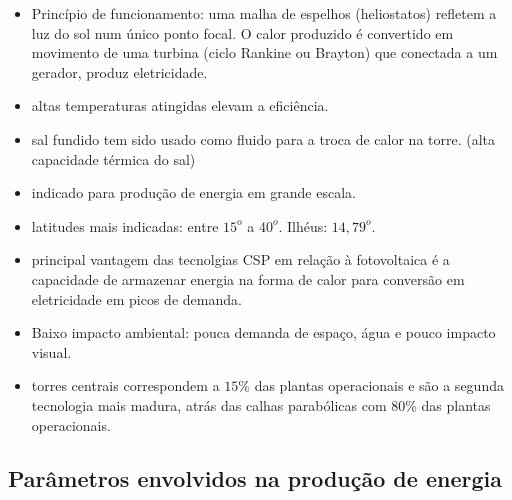 \documentclass[12pt,notheorems,hyperref={pdfauthor= Rafael Nardi}]{beamer}
\begin{document}
\begin{frame}%
	\begin{itemize}
		\item Princípio de funcionamento: uma malha de espelhos (heliostatos)
			refletem a luz do sol num único ponto focal. O calor produzido é
			convertido em movimento de uma turbina (ciclo Rankine ou Brayton) que
			conectada a um gerador, produz eletricidade.\pause
		\item altas temperaturas atingidas elevam a eficiência.\pause
		\item sal fundido tem sido usado como fluido para a troca de calor na
			torre. (alta capacidade térmica do sal) \pause
		\item indicado para produção de energia em grande escala.\pause
		\item latitudes mais indicadas: entre $15^o$ a $40^o$. Ilhéus: $14,79^o$.\pause
		\item principal vantagem das tecnolgias CSP em relação à fotovoltaica é a
			capacidade de armazenar energia na forma de calor para conversão em
			eletricidade em picos de demanda.\pause
		\item Baixo impacto ambiental: pouca demanda de espaço, água e pouco impacto visual.\pause
		\item torres centrais correspondem a $15\%$ das plantas operacionais e são
			a segunda tecnologia mais madura, atrás das calhas parabólicas com
			$80\%$ das plantas operacionais.
	\end{itemize}
\end{frame}

\subsection{Parâmetros envolvidos na produção de energia}
\end{document}
